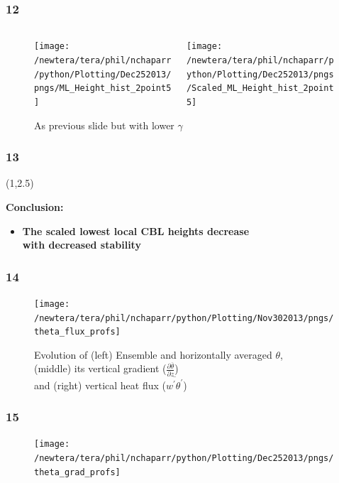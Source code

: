 \documentclass{beamer}
\newcommand\FrameText[1]{
\begin{textblock}{16}(1,2.5)
\raggedright #1
\end{textblock}}
\begin{document}
\begin{frame}
\frametitle{12}
\fontsize{12pt}{7.2}\selectfont
\begin{figure}
\begin{columns}[T]
   \begin{column}{.5\textwidth}
   \texttt{[image: /newtera/tera/phil/nchaparr/python/Plotting/Dec252013/pngs/ML\_Height\_hist\_2point5]} 
   \end{column} 
   
   \begin{column}{.5\textwidth}
    \texttt{[image: /newtera/tera/phil/nchaparr/python/Plotting/Dec252013/pngs/Scaled\_ML\_Height\_hist\_2point5]}
   \end{column}     
\end{columns}
\caption{As previous slide but with lower $\gamma$}
\end{figure}
\end{frame}


\begin{frame}
\frametitle{13}
\FrameText{\bf{\large Conclusion:}
\vspace{5mm}
\begin{itemize}
\item \bf{\large The scaled lowest local CBL heights decrease\\
with decreased stability}
\end{itemize}
}
\end{frame}

\begin{frame}
\frametitle{14}
\fontsize{12pt}{7.2}\selectfont
\begin{figure}
\centering
\texttt{[image: /newtera/tera/phil/nchaparr/python/Plotting/Nov302013/pngs/theta\_flux\_profs]}
\caption{Evolution of (left) Ensemble and horizontally averaged $\theta$,\\
(middle) its vertical gradient ($\frac{\partial \overline{\theta}}{\partial z}$)\\
and (right) vertical heat flux ($\overline{w^{'}\theta^{'}}$)}
\end{figure}
\end{frame}

\begin{frame}
\frametitle{15}
\fontsize{12pt}{7.2}\selectfont
\begin{figure}
\centering
\texttt{[image: /newtera/tera/phil/nchaparr/python/Plotting/Dec252013/pngs/theta\_grad\_profs]}
\end{figure}
\end{frame}
\end{document}
